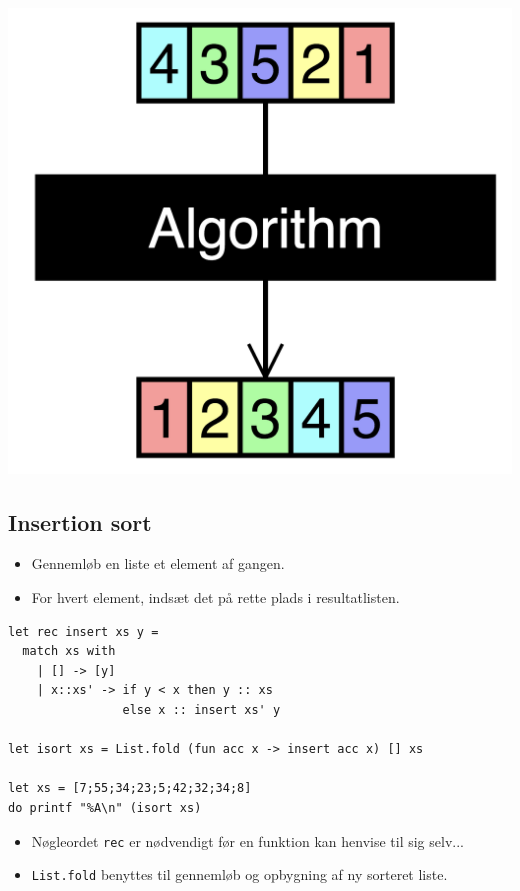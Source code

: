 \documentclass[rgb]{beamer}
\begin{document}
\begin{frame}[fragile]
\begin{footnotesize}
\begin{minipage}[b]{0.3\textwidth}
  \includegraphics[width=\textwidth]{../images/sorting_algorithms.png}
\end{minipage}
\end{footnotesize}
\end{frame}

\subsection{Insertion sort}
\begin{frame}[fragile]
\begin{footnotesize}


  \begin{itemize}
  \item Gennemløb en liste et element af gangen.
  \item For hvert element, indsæt det på rette plads i resultatlisten.
  \end{itemize}


\begin{lstlisting}[numbers=none,frame=none,mathescape]
let rec insert xs y =
  match xs with
    | [] -> [y]
    | x::xs' -> if y < x then y :: xs
                else x :: insert xs' y

let isort xs = List.fold (fun acc x -> insert acc x) [] xs

let xs = [7;55;34;23;5;42;32;34;8]
do printf "%A\n" (isort xs)
\end{lstlisting}

\begin{itemize}
\item Nøgleordet \lstinline{rec} er nødvendigt før en funktion kan henvise til sig selv...
\item \lstinline{List.fold} benyttes til gennemløb og opbygning af ny sorteret liste.
\end{itemize}
\end{footnotesize}
\end{frame}
\end{document}
